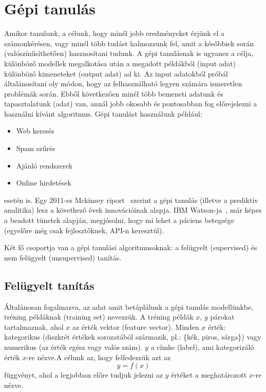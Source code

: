 \documentclass[a4paper,12pt]{article}
\begin{document}
\newpage
\section{Gépi tanulás}

Amikor tanulunk, a célunk, hogy minél jobb eredményeket érjünk el a számonkérésen, vagy minél több tudást halmozzunk fel, amit a későbbiek során (valószínűsíthetően) hasznosítani tudunk. A gépi tanulásnak is ugyanez a célja, különböző modellek megalkotása után a megadott példákból (input adat) különböző kimeneteket (output adat) ad ki. Az input adatokból próbál általánosítani oly módon, hogy az felhasználható legyen számára ismeretlen problémák során. Ebből következően minél több bemeneti adatunk és tapasztalatunk (adat) van, annál jobb okosabb és pontosabban fog előrejelezni a használni kívánt algoritmus. Gépi tanulást használunk például: 
\begin{itemize}
\item Web keresés
\item Spam szűrés
\item Ajánló rendszerek
\item Online hirdetések
\end{itemize}
esetén is. 
Egy 2011-es Mckinsey riport~\cite{mckinsey} szerint a gépi tanulás (illetve a prediktív analitika) lesz a következő évek innovációinak alapja. IBM Watson-ja~\cite{watson}, már képes a beadott tünetek alapján, megjósolni, hogy mi lehet a páciens betegsége (egyelőre még csak fejlesztőknek, API-n keresztül). \newline

Két fő csoportja van a gépi tanulási algoritmusoknak: a felügyelt (supervised) és nem felügyelt (unsupervised) tanítás.

\subsection{Felügyelt tanítás}

Általánosan fogalmazva, az adat amit betáplálunk a gépi tanulás modellünkbe, tréning példáknak (training set) nevezzük. A tréning példák $x$, $y$ párokat tartalmaznak, ahol $x$ az érték vektor (feature vector). Minden $x$ érték: kategorikus (diszkrét értékek sorozatából származik, pl.: \{kék, piros, sárga\}) vagy numerikus (az érték egész vagy valós szám). $y$ a címke (label), ami kategorizáló érték $x$-re nézve.A célunk az, hogy felfedezzük azt az 
\begin{equation*} y=f(x)
\end{equation*}
függvényt, ahol a legjobban előre tudjuk jelezni az $y$ értéket a meghatározott $x$-re nézve.
\end{document}
